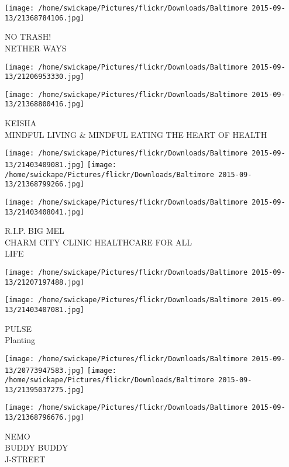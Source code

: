 \documentclass[10pt,letterpaper]{article}
\begin{document}
\vspace{0.25in}
\texttt{[image: /home/swickape/Pictures/flickr/Downloads/Baltimore 2015-09-13/21368784106.jpg]}

NO TRASH!\\
NETHER WAYS\\
\pagebreak

\texttt{[image: /home/swickape/Pictures/flickr/Downloads/Baltimore 2015-09-13/21206953330.jpg]}

\vspace{0.25in}
\texttt{[image: /home/swickape/Pictures/flickr/Downloads/Baltimore 2015-09-13/21368800416.jpg]}

KEISHA\\
MINDFUL LIVING \& MINDFUL EATING THE HEART OF HEALTH\\
\pagebreak

\texttt{[image: /home/swickape/Pictures/flickr/Downloads/Baltimore 2015-09-13/21403409081.jpg]}
\texttt{[image: /home/swickape/Pictures/flickr/Downloads/Baltimore 2015-09-13/21368799266.jpg]}

\vspace{0.25in}
\texttt{[image: /home/swickape/Pictures/flickr/Downloads/Baltimore 2015-09-13/21403408041.jpg]}

R.I.P. BIG MEL\\
CHARM CITY CLINIC HEALTHCARE FOR ALL\\
LIFE\\
\pagebreak

\texttt{[image: /home/swickape/Pictures/flickr/Downloads/Baltimore 2015-09-13/21207197488.jpg]}

\vspace{0.25in}
\texttt{[image: /home/swickape/Pictures/flickr/Downloads/Baltimore 2015-09-13/21403407081.jpg]}

PULSE\\
Planting\\
\pagebreak

\texttt{[image: /home/swickape/Pictures/flickr/Downloads/Baltimore 2015-09-13/20773947583.jpg]}
\texttt{[image: /home/swickape/Pictures/flickr/Downloads/Baltimore 2015-09-13/21395037275.jpg]}

\texttt{[image: /home/swickape/Pictures/flickr/Downloads/Baltimore 2015-09-13/21368796676.jpg]}

NEMO\\
BUDDY BUDDY\\
J{-}STREET\\
\pagebreak
\end{document}
